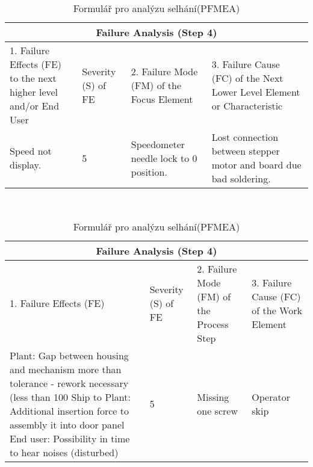 \begin{center}
\begin{table}[htp]
	\centering
	\caption{Formulář pro analýzu selhání(DFMEA) }
	\label{tab:failure_DFMEA}
\begin{tabular}{ |p{4cm}|p{0.5cm}|p{3cm}|p{4cm}|  }
 \hline
 \multicolumn{4}{|c|}{Failure Analysis (Step 4)} \\
 \hline
  1. Failure Effects (FE) to the next higher level and/or End User&
  \begin{turn}{-90}Severity (S) of FE\end{turn} &
2. Failure Mode (FM) of the Focus Element &
3. Failure Cause (FC) of the Next Lower Level Element or Characteristic
\\
 \hline
 Speed not display.
  & 5
  & Speedometer needle lock to 0 position. & Lost connection between stepper motor and board due bad soldering.
\\
 \hline
\end{tabular}\  
\\
\hfill \break
\hfill \break
\centering
	\caption{Formulář pro analýzu selhání(PFMEA) }
	\label{tab:failure_PFMEA}
\begin{tabular}{ |p{4cm}|p{0.5cm}|p{3cm}|p{4cm}|  }
 \hline
 \multicolumn{4}{|c|}{Failure Analysis (Step 4)} \\
 \hline
  1. Failure Effects (FE)
&
  \begin{turn}{-90}Severity (S) of FE\end{turn} &
2. Failure Mode (FM) of the Process Step
 &
3. Failure Cause (FC) of the Work Element

\\
 \hline
Plant:
Gap between housing and mechanism more than tolerance - rework necessary (less than 100%
Ship to Plant:
Additional insertion force to assembly it into door panel
End user:
Possibility in time to hear noises (disturbed)

  & 5
  & Missing one screw
 & Operator skip

\\
 \hline
\end{tabular}\  
\end{table}
\end{center}



